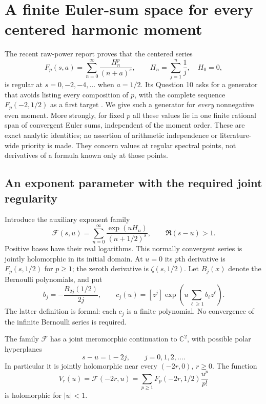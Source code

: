 \section{A finite Euler-sum space for every centered harmonic moment}
\label{hpnew:section}

The recent raw-power report proves that the centered series
\[
 F_p(s,a)=\sum_{n=0}^{\infty}\frac{H_n^p}{(n+a)^s},\qquad
 H_n=\sum_{j=1}^n\frac1j,\quad H_0=0,
\]
is regular at $s=0,-2,-4,\ldots$ when $a=1/2$.
Its Question 10 asks for a generator that avoids listing every
composition of $p$, with the complete sequence $F_p(-2,1/2)$ as a
first target \cite{RepoExactResonant}. We give such a generator for
\emph{every} nonnegative even moment. More strongly, for fixed $p$ all
these values lie in one finite rational span of convergent Euler sums,
independent of the moment order. These are exact analytic identities;
no assertion of arithmetic independence or literature-wide priority is
made. They concern values at regular spectral points, not derivatives
of a formula known only at those points.

\subsection{An exponent parameter with the required joint regularity}

Introduce the auxiliary exponent family
\begin{equation}\label{hpnew:exponent}
 \mathscr F(s,u)=\sum_{n=0}^{\infty}
       \frac{\exp(uH_n)}{(n+1/2)^s},\qquad
                    \Re(s-u)>1.
\end{equation}
Positive bases have their real logarithms. This normally convergent
series is jointly holomorphic in its initial domain. At $u=0$ its
$p$th derivative is $F_p(s,1/2)$ for $p\ge1$; the zeroth derivative is
$\zeta(s,1/2)$. Let $B_j(x)$ denote the Bernoulli polynomials, and put
\begin{equation}\label{hpnew:coefficients}
 b_j=-\frac{B_{2j}(1/2)}{2j},\qquad
 c_j(u)=[z^j]\exp\left(u\sum_{\ell\ge1}b_\ell z^\ell\right).
\end{equation}
The latter definition is formal: each $c_j$ is a finite polynomial.
No convergence of the infinite Bernoulli series is required.

\begin{lemma}
\label{hpnew:joint}
The family $\mathscr F$ has a joint meromorphic continuation to
$\mathbb C^2$, with possible polar hyperplanes
\begin{equation}\label{hpnew:divisors}
                         s-u=1-2j,\qquad j=0,1,2,\ldots.
\end{equation}
In particular it is jointly holomorphic near every $(-2r,0)$,
$r\ge0$. The function
\begin{equation}\label{hpnew:V}
 V_r(u)=\mathscr F(-2r,u)
       =\sum_{p\ge1}F_p(-2r,1/2)\frac{u^p}{p!}
\end{equation}
is holomorphic for $|u|<1$.
\end{lemma}

